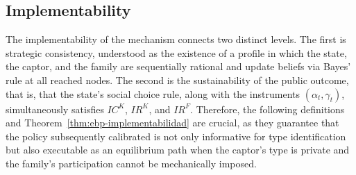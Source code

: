 \documentclass[pdflatex,sn-mathphys-ay]{sn-jnl}
\theoremstyle{plain}
\theoremstyle{definition}
\newcommand{\1}{\mathbf{1}}
\begin{document}
\subsection{Implementability}\label{subsec:implementabilidad}

\noindent The implementability of the mechanism connects two distinct levels. The first is strategic consistency, understood as the existence of a profile in which the state, the captor, and the family are sequentially rational and update beliefs via Bayes' rule at all reached nodes. The second is the sustainability of the public outcome, that is, that the state's social choice rule, along with the instruments $(\alpha_t,\gamma_t)$, simultaneously satisfies $IC^K$, $IR^K$, and $IR^F$. Therefore, the following definitions and Theorem~\ref{thm:ebp-implementabilidad} are crucial, as they guarantee that the policy subsequently calibrated is not only informative for type identification but also executable as an equilibrium path when the captor's type is private and the family's participation cannot be mechanically imposed.
\end{document}
